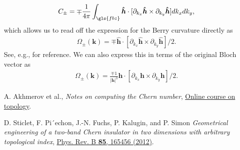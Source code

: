 \documentclass[english]{scrartcl}
\begin{document}
\begin{align}
C_\pm = \mp  \frac{1}{4 \pi} \int_{\gls{fbz}} \bm {\hat  h} \cdot [\partial_{k_x} \bm {\hat  h} \times \partial_{k_y} \bm {\hat  h}]dk_x dk_y,
\end{align}
which allows us to read off the expression for the Berry curvature directly as
\begin{align}
\Omega_{\pm}(\bm k) = \mp \bm {\hat  h} \cdot [\partial_{k_x} \bm {\hat  h} \times \partial_{k_y} \bm {\hat  h}]/ 2.
\end{align}
See, e.g., \cite{Chern_engineering} for reference. We can also express this in terms of the original Bloch vector as
\begin{align}
\Omega_{\pm}(\bm k) = \frac{\mp 1}{|\bm h|^3}\bm {h} \cdot [\partial_{k_x} \bm {h} \times \partial_{k_y} \bm {h}]/ 2.
\end{align}

\printnoidxglossaries

\newpage
\begin{thebibliography}{10}
A. Akhmerov et al., {\em Notes on computing the Chern number}, \href{https://topocondmat.org/w4_haldane/ComputingChern.html}{Online course on topology}.

D. Sticlet, F. Pi´echon, J.-N. Fuchs, P. Kalugin, and P. Simon {\em Geometrical engineering of a two-band Chern insulator in two dimensions with arbitrary
topological index}, \href{https://journals.aps.org/prb/abstract/10.1103/PhysRevB.85.165456}{Phys. Rev. B {\bfseries 85}, 165456 (2012)}.
\end{thebibliography}
\end{document}
